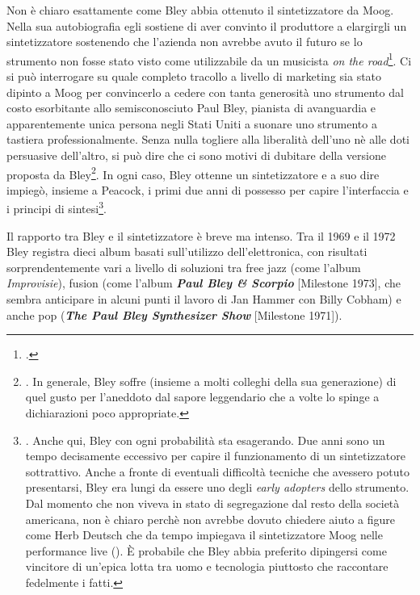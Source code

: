 Non è chiaro esattamente come Bley abbia ottenuto il sintetizzatore da Moog. Nella sua autobiografia egli sostiene di aver convinto il produttore a elargirgli un sintetizzatore sostenendo che l'azienda non avrebbe avuto il futuro se lo strumento non fosse stato visto come utilizzabile da un musicista \textit{on the road}\footcite[110]{stopping}. Ci si può interrogare su quale completo tracollo a livello di marketing sia stato dipinto a Moog per convincerlo a cedere con tanta generosità uno strumento dal costo esorbitante allo semisconosciuto Paul Bley, pianista di avanguardia e apparentemente unica persona negli Stati Uniti a suonare uno strumento a tastiera professionalmente. Senza nulla togliere alla liberalità dell'uno nè alle doti persuasive dell'altro, si può dire che ci sono motivi di dubitare della versione proposta da Bley\footnote{\cite[307]{gluck}. In generale, Bley soffre (insieme a molti colleghi della sua generazione) di quel gusto per l'aneddoto dal sapore leggendario che a volte lo spinge a dichiarazioni poco appropriate.}. In ogni caso, Bley ottenne un sintetizzatore e a suo dire impiegò, insieme a Peacock, i primi due anni di possesso per capire l'interfaccia e i principi di sintesi\footnote{\cite[109]{stopping}. Anche qui, Bley con ogni probabilità sta esagerando. Due anni sono un tempo decisamente eccessivo per capire il funzionamento di un sintetizzatore sottrattivo. Anche a fronte di eventuali difficoltà tecniche che avessero potuto presentarsi, Bley era lungi da essere uno degli \textit{early adopters} dello strumento. Dal momento che non viveva in stato di segregazione dal resto della società americana, non è chiaro perchè non avrebbe dovuto chiedere aiuto a figure come Herb Deutsch che da tempo impiegava il sintetizzatore Moog nelle performance live (\cite[307]{gluck}). È probabile che Bley abbia preferito dipingersi come vincitore di un'epica lotta tra uomo e tecnologia piuttosto che raccontare fedelmente i fatti.}. \par
Il rapporto tra Bley e il sintetizzatore è breve ma intenso. Tra il 1969 e il 1972 Bley registra dieci album basati sull'utilizzo dell'elettronica, con risultati sorprendentemente vari a livello di soluzioni tra free jazz (come l'album \textit{Improvisie}), fusion (come l'album \textit{\textbf{Paul Bley \& Scorpio}} [Milestone 1973], che sembra anticipare in alcuni punti il lavoro di Jan Hammer con Billy Cobham) e anche pop (\textit{\textbf{The Paul Bley Synthesizer Show}} [Milestone 1971]).\par
